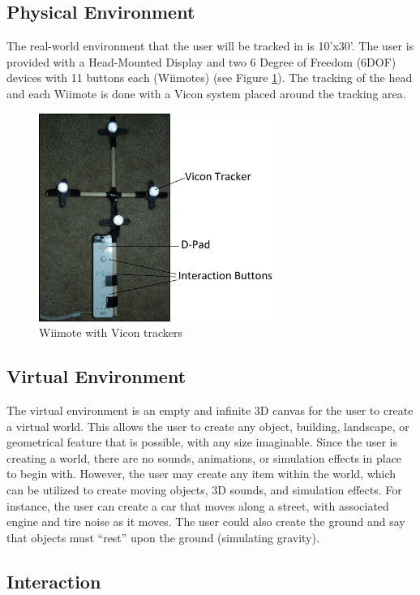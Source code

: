 \label{Design}
\subsection{Physical Environment}
\label{Design:PhysicalEnvironment}
The real-world environment that the user will be tracked in is 10'x30'.
The user is provided with a Head-Mounted Display and two 6 Degree of Freedom (6DOF) devices with 11 buttons each (Wiimotes) (see Figure \ref{fig:wiimote}).
The tracking of the head and each Wiimote is done with a Vicon system placed around the tracking area.

\begin{figure}[htbp]
	\centering
	\includegraphics[width=3in]{figs/wiimote.pdf}
	\caption{Wiimote with Vicon trackers}
	\label{fig:wiimote}
\end{figure}

\subsection{Virtual Environment}
\label{Design:VirtualEnvironment}
The virtual environment is an empty and infinite 3D canvas for the user to create a virtual world.
This allows the user to create any object, building, landscape, or geometrical feature that is possible, with any size imaginable.
Since the user is creating a world, there are no sounds, animations, or simulation effects in place to begin with.
However, the user may create any item within the world, which can be utilized to create moving objects, 3D sounds, and simulation effects.
For instance, the user can create a car that moves along a street, with associated engine and tire noise as it moves.
The user could also create the ground and say that objects must ``rest'' upon the ground (simulating gravity).

\subsection{Interaction}
\label{Design:Interaction}

